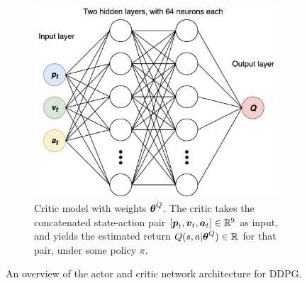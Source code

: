 \begin{figure}[htb]
\begin{subfigure}[b]{0.49\textwidth}
        \includegraphics[width=.95\textwidth]{figures/4_/4_5_critic.drawio.png}
        \caption{Critic model with weights $\boldsymbol{\theta}^Q$. The critic takes the concatenated state-action pair $[{\boldsymbol{p}}_t, {\boldsymbol{v}}_t, {\boldsymbol{a}}_t] \in \mathbb{R}^9$ as input, and yields the \textcolor[HTML]{CC262A}{estimated return} $Q(s,a | \boldsymbol{\theta}^Q) \in \mathbb{R}$ for that pair, under some policy $\pi$.}
        \label{fig:4_3_critic}
    \end{subfigure}
    \hfill
    \caption{An overview of the actor and critic network architecture for DDPG.}
    \label{fig:4_3_networkArchitecture}
\end{figure}
